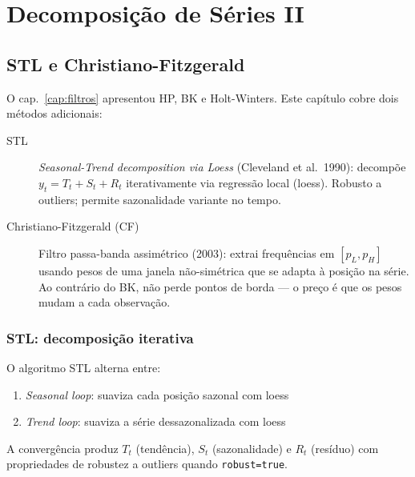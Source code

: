 \chapter{Decomposição de Séries II}
\label{cap:filtros2}

\section{STL e Christiano-Fitzgerald}

O cap.~\ref{cap:filtros} apresentou HP, BK e Holt-Winters. Este capítulo
cobre dois métodos adicionais:

\begin{description}
  \item[STL] \emph{Seasonal-Trend decomposition via Loess} (Cleveland et al.~1990):
    decompõe $y_t = T_t + S_t + R_t$ iterativamente via regressão local (loess).
    Robusto a outliers; permite sazonalidade variante no tempo.

  \item[Christiano-Fitzgerald (CF)] Filtro passa-banda assimétrico (2003):
    extrai frequências em $[p_L, p_H]$ usando pesos de uma janela
    não-simétrica que se adapta à posição na série. Ao contrário do BK, não
    perde pontos de borda — o preço é que os pesos mudam a cada observação.
\end{description}

\subsection*{STL: decomposição iterativa}

O algoritmo STL alterna entre:
\begin{enumerate}
  \item \emph{Seasonal loop}: suaviza cada posição sazonal com loess
  \item \emph{Trend loop}: suaviza a série dessazonalizada com loess
\end{enumerate}
A convergência produz $T_t$ (tendência), $S_t$ (sazonalidade) e $R_t$ (resíduo)
com propriedades de robustez a outliers quando \texttt{robust=true}.

